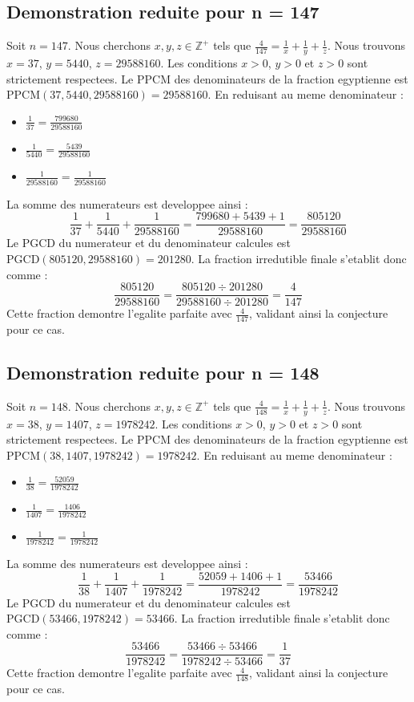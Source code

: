 \documentclass[11pt,a4paper]{article}
\begin{document}
\subsection{Demonstration reduite pour n = 147}
Soit $n = 147$. Nous cherchons $x, y, z \in \mathbb{Z}^{+}$ tels que $\frac{4}{147} = \frac{1}{x} + \frac{1}{y} + \frac{1}{z}$.
Nous trouvons $x = 37$, $y = 5440$, $z = 29588160$.
Les conditions $x > 0$, $y > 0$ et $z > 0$ sont strictement respectees.
Le PPCM des denominateurs de la fraction egyptienne est $\text{PPCM}(37, 5440, 29588160) = 29588160$.
En reduisant au meme denominateur :
\begin{itemize}
    \item $\frac{1}{37} = \frac{799680}{29588160}$
    \item $\frac{1}{5440} = \frac{5439}{29588160}$
    \item $\frac{1}{29588160} = \frac{1}{29588160}$
\end{itemize}
La somme des numerateurs est developpee ainsi :
$$ \frac{1}{37} + \frac{1}{5440} + \frac{1}{29588160} = \frac{799680 + 5439 + 1}{29588160} = \frac{805120}{29588160} $$
Le PGCD du numerateur et du denominateur calcules est $\text{PGCD}(805120, 29588160) = 201280$.
La fraction irredutible finale s'etablit donc comme :
$$ \frac{805120}{29588160} = \frac{805120 \div 201280}{29588160 \div 201280} = \frac{4}{147} $$
Cette fraction demontre l'egalite parfaite avec $\frac{4}{147}$, validant ainsi la conjecture pour ce cas.

\subsection{Demonstration reduite pour n = 148}
Soit $n = 148$. Nous cherchons $x, y, z \in \mathbb{Z}^{+}$ tels que $\frac{4}{148} = \frac{1}{x} + \frac{1}{y} + \frac{1}{z}$.
Nous trouvons $x = 38$, $y = 1407$, $z = 1978242$.
Les conditions $x > 0$, $y > 0$ et $z > 0$ sont strictement respectees.
Le PPCM des denominateurs de la fraction egyptienne est $\text{PPCM}(38, 1407, 1978242) = 1978242$.
En reduisant au meme denominateur :
\begin{itemize}
    \item $\frac{1}{38} = \frac{52059}{1978242}$
    \item $\frac{1}{1407} = \frac{1406}{1978242}$
    \item $\frac{1}{1978242} = \frac{1}{1978242}$
\end{itemize}
La somme des numerateurs est developpee ainsi :
$$ \frac{1}{38} + \frac{1}{1407} + \frac{1}{1978242} = \frac{52059 + 1406 + 1}{1978242} = \frac{53466}{1978242} $$
Le PGCD du numerateur et du denominateur calcules est $\text{PGCD}(53466, 1978242) = 53466$.
La fraction irredutible finale s'etablit donc comme :
$$ \frac{53466}{1978242} = \frac{53466 \div 53466}{1978242 \div 53466} = \frac{1}{37} $$
Cette fraction demontre l'egalite parfaite avec $\frac{4}{148}$, validant ainsi la conjecture pour ce cas.
\end{document}
